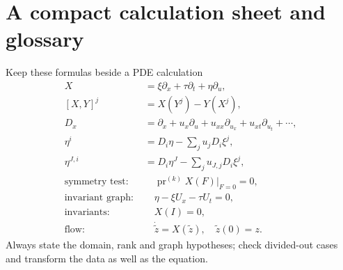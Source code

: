 \documentclass[11pt,a4paper]{article}
\numberwithin{equation}{section}
\theoremstyle{definition}
\theoremstyle{plain}
\theoremstyle{remark}
\newcommand{\pr}{\operatorname{pr}}
\begin{document}
\section{A compact calculation sheet and glossary}\label{app:sheet}
\begin{idea}{Keep these formulas beside a PDE calculation}
\begin{align*}
X&=\xi\partial_x+\tau\partial_t+\eta\partial_u,\\
[X,Y]^j&=X(Y^j)-Y(X^j),\\
D_x&=\partial_x+u_x\partial_u+u_{xx}\partial_{u_x}+u_{xt}\partial_{u_t}+\cdots,\\
\eta^i&=D_i\eta-\sum_j u_jD_i\xi^j,\\
\eta^{J,i}&=D_i\eta^J-\sum_j u_{J,j}D_i\xi^j,\\
\text{symmetry test: }&\quad\pr^{(k)}X(F)|_{F=0}=0,\\
\text{invariant graph: }&\quad\eta-\xi U_x-\tau U_t=0,\\
\text{invariants: }&\quad X(I)=0,\\
\text{flow: }&\quad\dot{\widetilde z}=X(\widetilde z),\quad\widetilde z(0)=z.
\end{align*}
Always state the domain, rank and graph hypotheses; check divided-out cases and transform the data as well as the equation.
\end{idea}
\end{document}
